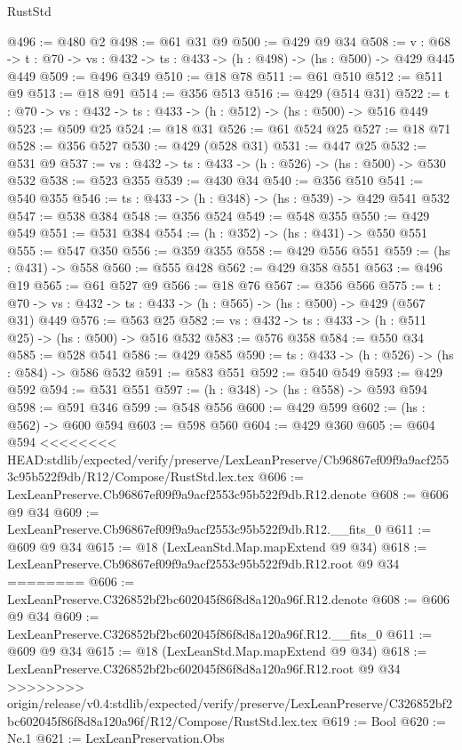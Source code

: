 \begin{lexlean}{RustStd}
\begin{coremodule}
{\begin{coremodule}
@496 := @480 @2
@498 := @61 @31 @9
@500 := @429 @9 @34
@508 := {v : @68} ->
  {t : @70} -> {vs : @432} -> {ts : @433} -> (h : @498) -> (hs : @500) -> @429 @445 @449
@509 := @496 @349
@510 := @18 @78
@511 := @61 @510
@512 := @511 @9
@513 := @18 @91
@514 := @356 @513
@516 := @429 (@514 @31)
@522 := {t : @70} -> {vs : @432} -> {ts : @433} -> (h : @512) -> (hs : @500) -> @516 @449
@523 := @509 @25
@524 := @18 @31
@526 := @61 @524 @25
@527 := @18 @71
@528 := @356 @527
@530 := @429 (@528 @31)
@531 := @447 @25
@532 := @531 @9
@537 := {vs : @432} -> {ts : @433} -> (h : @526) -> (hs : @500) -> @530 @532
@538 := @523 @355
@539 := @430 @34
@540 := @356 @510
@541 := @540 @355
@546 := {ts : @433} -> (h : @348) -> (hs : @539) -> @429 @541 @532
@547 := @538 @384
@548 := @356 @524
@549 := @548 @355
@550 := @429 @549
@551 := @531 @384
@554 := (h : @352) -> (hs : @431) -> @550 @551
@555 := @547 @350
@556 := @359 @355
@558 := @429 @556 @551
@559 := (hs : @431) -> @558
@560 := @555 @428
@562 := @429 @358 @551
@563 := @496 @19
@565 := @61 @527 @9
@566 := @18 @76
@567 := @356 @566
@575 := {t : @70} -> {vs : @432} -> {ts : @433} -> (h : @565) -> (hs : @500) -> @429 (@567 @31) @449
@576 := @563 @25
@582 := {vs : @432} -> {ts : @433} -> (h : @511 @25) -> (hs : @500) -> @516 @532
@583 := @576 @358
@584 := @550 @34
@585 := @528 @541
@586 := @429 @585
@590 := {ts : @433} -> (h : @526) -> (hs : @584) -> @586 @532
@591 := @583 @551
@592 := @540 @549
@593 := @429 @592
@594 := @531 @551
@597 := (h : @348) -> (hs : @558) -> @593 @594
@598 := @591 @346
@599 := @548 @556
@600 := @429 @599
@602 := (hs : @562) -> @600 @594
@603 := @598 @560
@604 := @429 @360
@605 := @604 @594
<<<<<<<< HEAD:stdlib/expected/verify/preserve/LexLeanPreserve/Cb96867ef09f9a9acf2553c95b522f9db/R12/Compose/RustStd.lex.tex
@606 := LexLeanPreserve.Cb96867ef09f9a9acf2553c95b522f9db.R12.denote
@608 := @606 @9 @34
@609 := LexLeanPreserve.Cb96867ef09f9a9acf2553c95b522f9db.R12.__fits_0
@611 := @609 @9 @34
@615 := @18 (LexLeanStd.Map.mapExtend @9 @34)
@618 := LexLeanPreserve.Cb96867ef09f9a9acf2553c95b522f9db.R12.root @9 @34
========
@606 := LexLeanPreserve.C326852bf2bc602045f86f8d8a120a96f.R12.denote
@608 := @606 @9 @34
@609 := LexLeanPreserve.C326852bf2bc602045f86f8d8a120a96f.R12.__fits_0
@611 := @609 @9 @34
@615 := @18 (LexLeanStd.Map.mapExtend @9 @34)
@618 := LexLeanPreserve.C326852bf2bc602045f86f8d8a120a96f.R12.root @9 @34
>>>>>>>> origin/release/v0.4:stdlib/expected/verify/preserve/LexLeanPreserve/C326852bf2bc602045f86f8d8a120a96f/R12/Compose/RustStd.lex.tex
@619 := Bool
@620 := Ne.{1}
@621 := LexLeanPreservation.Obs

\end{coremodule}}
\end{coremodule}
\end{lexlean}
